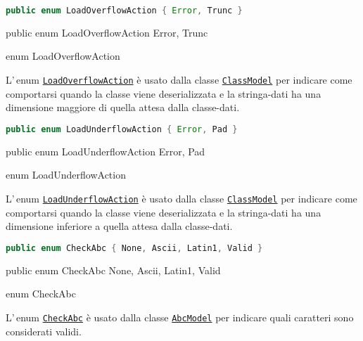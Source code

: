 \ifesource
\begin{lstlisting}[language=java, 
caption=enum LoadOverflowAction, 
label=lst:LoadOverflowAction]
public enum LoadOverflowAction { Error, Trunc }
\end{lstlisting}
\else
\begin{elisting}
\begin{javacode}
public enum LoadOverflowAction { Error, Trunc }
\end{javacode}
\caption{enum LoadOverflowAction}\label{lst:LoadOverflowAction}
\end{elisting}
\fi
L'\,enum \hyperref[lst:LoadOverflowAction]{\texttt{LoadOverflowAction}} è usato 
dalla classe \hyperref[lst:ClassModel]{\texttt{ClassModel}} per indicare come 
comportarsi quando la classe viene deserializzata e la stringa-dati ha una 
dimensione maggiore di quella attesa dalla classe-dati.

\ifesource
\begin{lstlisting}[language=java, 
caption=enum LoadUnderflowAction, 
label=lst:LoadUnderflowAction]
public enum LoadUnderflowAction { Error, Pad }
\end{lstlisting}
\else
\begin{elisting}
\begin{javacode}
public enum LoadUnderflowAction { Error, Pad }
\end{javacode}
\caption{enum LoadUnderflowAction}\label{lst:LoadUnderflowAction}
\end{elisting}
\fi
L'\,enum \hyperref[lst:LoadUnderflowAction]{\texttt{LoadUnderflowAction}} è 
usato dalla classe \hyperref[lst:ClassModel]{\texttt{ClassModel}} per indicare 
come comportarsi quando la classe viene deserializzata e la stringa-dati ha una 
dimensione inferiore a quella attesa dalla classe-dati.

\ifesource
\begin{lstlisting}[language=java, 
caption=enum CheckAbc, 
label=lst:CheckAbc]
public enum CheckAbc { None, Ascii, Latin1, Valid }
\end{lstlisting}
\else
\begin{elisting}
\begin{javacode}
public enum CheckAbc { None, Ascii, Latin1, Valid }
\end{javacode}
\caption{enum CheckAbc}\label{lst:CheckAbc}
\end{elisting}
\fi
L'\,enum \hyperref[lst:CheckAbc]{\texttt{CheckAbc}} è usato dalla classe
\hyperref[lst:AbcModel]{\texttt{AbcModel}} per indicare quali caratteri sono
considerati validi.

